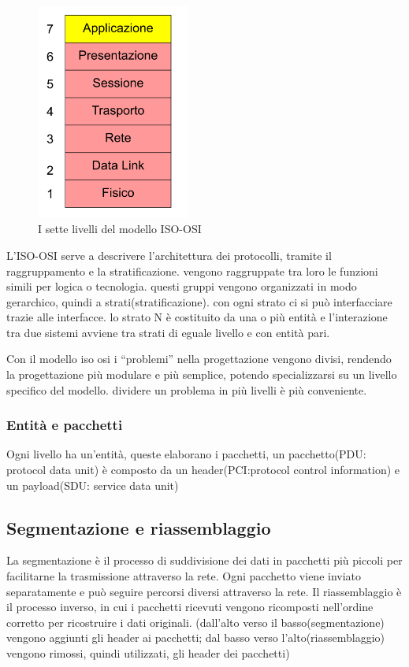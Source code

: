 \begin{figure}[h!]
    \centering
    \includegraphics[width=0.45\textwidth]{images/ISO_OSI_livelli.png}
    \caption{I sette livelli del modello ISO-OSI}
    \label{fig:iso_osi_livelli}
\end{figure}

L'ISO-OSI serve a descrivere l'architettura dei protocolli, tramite il raggruppamento e la stratificazione.
vengono raggruppate tra loro le funzioni simili per logica o tecnologia.
questi gruppi vengono organizzati in modo gerarchico, quindi a strati(stratificazione). con ogni strato ci si può interfacciare trazie alle interfacce.
lo strato N è costituito da una o più entità e l'interazione tra due sistemi avviene tra strati di eguale livello e con entità pari.

Con il modello iso osi i “problemi” nella progettazione vengono divisi, rendendo la progettazione più modulare e più semplice, potendo specializzarsi su un livello specifico del modello. dividere un problema in più livelli è più conveniente. 
\subsubsection{Entità e pacchetti}
Ogni livello ha un'entità, queste elaborano i pacchetti, un pacchetto(PDU: protocol data unit) è composto da un header(PCI:protocol control information) e un payload(SDU: service data unit) 
\subsection{Segmentazione e riassemblaggio} 
La segmentazione è il processo di suddivisione dei dati in pacchetti più piccoli per facilitarne la trasmissione attraverso la rete. Ogni pacchetto viene inviato separatamente e può seguire percorsi diversi attraverso la rete. Il riassemblaggio è il processo inverso, in cui i pacchetti ricevuti vengono ricomposti nell'ordine corretto per ricostruire i dati originali.
(dall’alto verso il basso(segmentazione) vengono aggiunti gli header ai pacchetti; dal basso verso l’alto(riassemblaggio) vengono rimossi, quindi utilizzati, gli header dei pacchetti)
